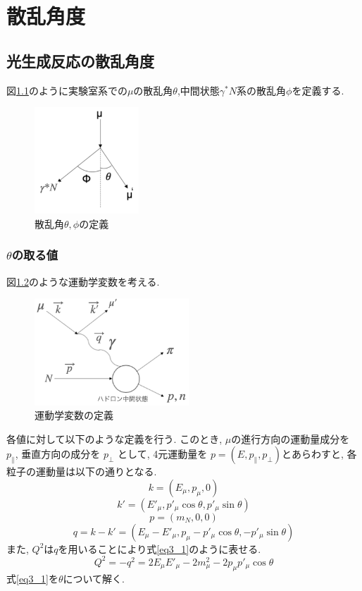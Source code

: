 \chapter{散乱角度}\label{cha:angle}
\section{光生成反応の散乱角度}
図\ref{fig:angle1}のように実験室系での$\mu$の散乱角$\theta$,中間状態$\gamma^*N$系の散乱角$\phi$を定義する.
\begin{figure}[H]
    \centering
    \includegraphics[height=4cm]{img/angle_diagram.png}
    \caption{散乱角$\theta, \phi$の定義}
    \label{fig:angle1}
\end{figure}

\subsection{$\theta$の取る値}
図\ref{fig:angle2}のような運動学変数を考える.
\begin{figure}[H]
    \centering
    \includegraphics[height=4cm]{img/diagram_3momentum.png}
    \caption{運動学変数の定義}
    \label{fig:angle2}
\end{figure}
各値に対して以下のような定義を行う.
このとき, $\mu$の進行方向の運動量成分を
$p_\parallel$, 垂直方向の成分を $p_\perp$ として, 4元運動量を
$p = (E, p_\parallel, p_\perp) $とあらわすと, 各粒子の運動量は以下の通りとなる.
\begin{equation}
    k = (E_\mu , p_\mu,0)
\end{equation}
\begin{equation}
    k' = (E'_\mu, p'_\mu \cos\theta, p'_\mu \sin\theta)
\end{equation}
\begin{equation}
    p = (m_N, 0, 0)
\end{equation}
\begin{equation}
    q = k-k'=(E_\mu - E'_\mu, p_\mu-p'_\mu \cos\theta, -p'_\mu \sin\theta)
\end{equation}
また, $Q^2$は$q$を用いることにより式\ref{eq3_1}のように表せる.
\begin{equation}
    \label{eq3_1}
    Q^2 = -q^2 = 2E_\mu E'_\mu -2m^2_\mu-2p_\mu p'_\mu \cos\theta
\end{equation}
式\ref{eq3_1}を$\theta$について解く.

